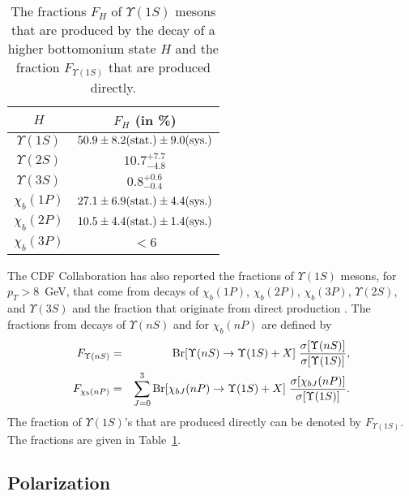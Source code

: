 \begin{table}[ht]
\begin{center}
\begin{tabular}{|c|c|} 
\hline \hline
$H$ & $F_H$ (in \%) \\ 
\hline
$\Upsilon(1S)$  & $50.9 \pm 8.2(\hbox{stat.}) \pm 9.0(\hbox{sys.})$ \\ 
$\Upsilon(2S)$  & $10.7^{+7.7}_{-4.8}$ \\ 
$\Upsilon(3S)$  & $ 0.8^{+0.6}_{-0.4}$ \\ 
$\chi_b(1P)$    & $27.1 \pm 6.9(\hbox{stat.}) \pm 4.4(\hbox{sys.})$ \\
$\chi_b(2P)$    & $10.5 \pm 4.4(\hbox{stat.}) \pm 1.4(\hbox{sys.})$ \\
$\chi_b(3P)$    & $< 6$ \\
\hline \hline
\end{tabular}
\caption{The fractions $F_H$ of $\Upsilon(1S)$ mesons that are produced 
by the decay of a higher bottomonium state $H$ and the fraction 
$F_{\Upsilon(1S)}$ that are produced directly.}
\label{prodsec:Upsfractions}
\end{center}
\end{table}

The CDF Collaboration has also reported the fractions of $\Upsilon(1S)$
mesons, for $p_T> 8$~GeV, that come from decays of $\chi_b(1P)$, 
$\chi_b(2P)$, $\chi_b(3P)$, $\Upsilon(2S)$, and $\Upsilon(3S)$ and the 
fraction that originate from direct production \cite{Affolder:2000nn}. 
The fractions from decays of $\Upsilon(nS)$ and for $\chi_b(nP)$ 
are defined by
%
\begin{eqnarray}
F_{\Upsilon(nS)} &=& 
{\rm Br}[\Upsilon(nS) \to \Upsilon(1S) + X] \; 
{\sigma[\Upsilon(nS)] \over \sigma[\Upsilon(1S)]},
\label{FUpsUps}
\\
F_{\chi_b(nP)} &=& \sum_{J=0}^3
{\rm Br}[\chi_{bJ}(nP) \to \Upsilon(1S) + X] \;
{\sigma[\chi_{bJ}(nP)] \over \sigma[\Upsilon(1S)]}.
\label{FUpschi}
\end{eqnarray}
%
The fraction of $\Upsilon(1S)$'s that are produced directly
can be denoted by $F_{\Upsilon(1S)}$.
The fractions are given in Table~\ref{prodsec:Upsfractions}.


\subsection{Polarization} 
\label{prodsec:tevatronpol}

